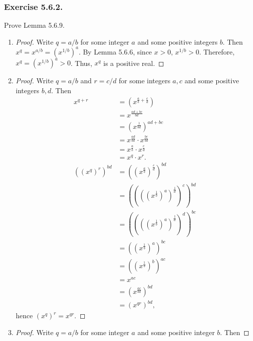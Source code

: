 \documentclass[12pt, letter]{article}
\begin{document}
\subsubsection*{Exercise 5.6.2.}
Prove Lemma 5.6.9.
\begin{enumerate}[label=(\alph*)]
    \item \begin{proof}
        Write $q=a/b$ for some integer $a$ and some positive integers $b$. Then $x^q=x^{a/b}=(x^{1/b})^a$. By Lemma 5.6.6, since $x>0$, $x^{1/b}>0$. Therefore, $x^q=(x^{1/b})^a>0$. Thus, $x^q$ is a positive real.
    \end{proof}
    \item \begin{proof}
        Write $q=a/b$ and $r=c/d$ for some integers $a,c$ and some positive integers $b,d$. Then 
        \begin{equation*}
            \begin{aligned}
                x^{q+r}&=(x^{\frac{a}{b}+\frac{c}{d}})\\
                &=x^{\frac{ad+bc}{bd}}\\
                &=(x^{\frac{1}{bd}})^{ad+bc}\\
                &=x^{\frac{ad}{bd}}\cdot x^{\frac{bc}{bd}}\\
                &=x^{\frac{a}{b}}\cdot x^{\frac{c}{d}}\\
                &=x^q\cdot x^r.\\
                ((x^q)^r)^{bd}&=((x^{\frac{a}{b}})^{\frac{c}{d}})^{bd}\\
                &=((((x^{\frac{1}{b}})^a)^{\frac{1}{d}})^c)^{bd}\\
                &=((((x^{\frac{1}{b}})^a)^{\frac{1}{d}})^d)^{bc}\\
                &=((x^{\frac{1}{b}})^a)^{bc}\\
                &=((x^{\frac{1}{b}})^b)^{ac}\\
                &=x^{ac}\\
                &=(x^{\frac{ac}{bd}})^{bd}\\
                &=(x^{qr})^{bd},
            \end{aligned}
        \end{equation*}
        hence $(x^q)^r=x^{qr}$. 
    \end{proof}
    \item \begin{proof}
        Write $q=a/b$ for some integer $a$ and some positive integer $b$. Then 

\end{proof}
\end{enumerate}
\end{document}
